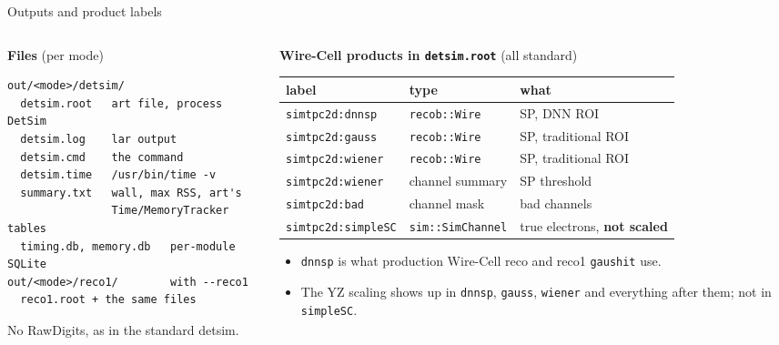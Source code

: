 \documentclass[aspectratio=169,10pt]{beamer}
\newcommand{\code}[1]{\texttt{#1}}
\begin{document}
\begin{frame}[fragile]{Outputs and product labels}
\small
\begin{columns}[T]
\begin{column}{0.41\textwidth}
\textbf{Files} (per mode)
\begin{lstlisting}
out/<mode>/detsim/
  detsim.root   art file, process DetSim
  detsim.log    lar output
  detsim.cmd    the command
  detsim.time   /usr/bin/time -v
  summary.txt   wall, max RSS, art's
                Time/MemoryTracker tables
  timing.db, memory.db   per-module SQLite
out/<mode>/reco1/        with --reco1
  reco1.root + the same files
\end{lstlisting}
\vspace{1mm}
No RawDigits, as in the standard detsim.
\end{column}
\begin{column}{0.57\textwidth}
\textbf{Wire-Cell products in \code{detsim.root}} (all standard)\\[1mm]
\scriptsize
\begin{tabular}{@{}lll@{}}
\toprule
label & type & what \\
\midrule
\code{simtpc2d:dnnsp} & \code{recob::Wire} & SP, DNN ROI \\
\code{simtpc2d:gauss} & \code{recob::Wire} & SP, traditional ROI \\
\code{simtpc2d:wiener} & \code{recob::Wire} & SP, traditional ROI \\
\code{simtpc2d:wiener} & channel summary & SP threshold \\
\code{simtpc2d:bad} & channel mask & bad channels \\
\code{simtpc2d:simpleSC} & \code{sim::SimChannel} & true electrons, \textbf{not scaled} \\
\bottomrule
\end{tabular}
\vspace{2mm}
\small
\begin{itemize}
\item \code{dnnsp} is what production Wire-Cell reco and reco1 \code{gaushit} use.
\item The YZ scaling shows up in \code{dnnsp}, \code{gauss}, \code{wiener} and everything after them; not in \code{simpleSC}.
\end{itemize}
\end{column}
\end{columns}
\end{frame}
\end{document}
